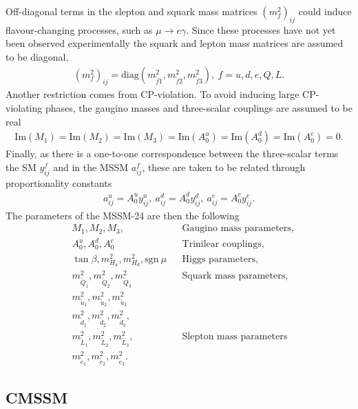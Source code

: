 \documentclass[twoside,english]{uiofysmaster}
\begin{document}
Off-diagonal terms in the slepton and squark mass matrices $(m_f^2)_{ij}$ could induce flavour-changing processes, such as $\mu \rightarrow e \gamma$. Since these processes have not yet been observed experimentally the squark and lepton mass matrices are assumed to be diagonal,
\begin{align}
(m_f^2)_{ij} = \text{diag}(m_{\tilde{f}1}^2, m_{\tilde{f}2}^2, m_{\tilde{f}3}^2), ~f = u, d, e, Q, L.
\end{align}
Another restriction comes from CP-violation. To avoid inducing large CP-violating phases, the gaugino masses and three-scalar couplings are assumed to be real
\begin{align}
\text{Im}(M_1) = \text{Im}(M_2) = \text{Im} (M_3) = \text{Im} (A_0^u) = \text{Im} (A_0^d) = \text{Im} (A_0^e) = 0.
\end{align}
Finally, as there is a one-to-one correspondence between the three-scalar terms the SM $y_{ij}^f$ and in the MSSM $a^f_{ij}$, these are taken to be related through proportionality constants
\begin{align}
a^u_{ij} = A_0^uy_{ij}^u, ~a^d_{ij} = A_0^dy_{ij}^d, ~a^e_{ij} = A_0^ey_{ij}^e.
\end{align}
 The parameters of the MSSM-24 are then the following
\begin{align}
&M_1, M_2, M_3, && \text{Gaugino mass parameters,} \nonumber \\
&A_0^u, A_0^d, A_0^e && \text{Trinilear couplings,} \nonumber\\
&\tan \beta,m_{H_u}^2,m_{H_d}^2, \text{sgn}~ \mu && \text{Higgs parameters,} \nonumber\\
& m_{\tilde{Q}_1}^2, m_{\tilde{Q}_2}^2, m_{\tilde{Q}_3}^2 && \text{Squark mass parameters,}\nonumber\\
& m_{\tilde{u}_1}^2, m_{\tilde{u}_2}^2, m_{\tilde{u}_3}^2\nonumber\\
&m_{\tilde{d}_1}^2, m_{\tilde{d}_2}^2, m_{\tilde{d}_3}^2,\nonumber\\
& m_{\tilde{L}_1}^2, m_{\tilde{L}_2}^2, m_{\tilde{L}_3}^2, &&\text{Slepton mass parameters}\nonumber\\
& m_{\tilde{e}_1}^2, m_{\tilde{e}_2}^2, m_{\tilde{e}_3}^2.\nonumber
\end{align}

\subsection{CMSSM}\label{Sec:: physics back : CMSSM}
\end{document}
